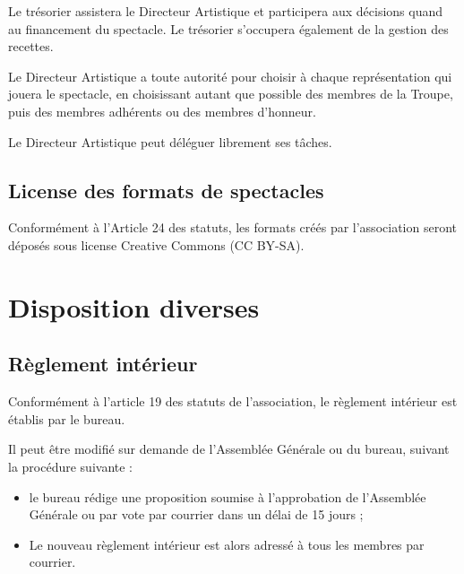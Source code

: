 \documentclass[a4paper,french,10pt]{article}
\begin{document}
Le trésorier assistera le Directeur Artistique et participera aux décisions quand au financement du spectacle. Le trésorier s'occupera également de la gestion des recettes.

Le Directeur Artistique a toute autorité pour choisir à chaque représentation qui jouera le spectacle, en choisissant autant que possible des membres de la Troupe, puis des membres adhérents ou des membres d'honneur.

Le Directeur Artistique peut déléguer librement ses tâches.

\subsection{License des formats de spectacles}
Conformément à l'Article 24 des statuts, les formats créés par l'association seront déposés sous license Creative Commons (CC BY-SA).


\section{Disposition diverses}
\subsection{Règlement intérieur}
Conformément à l'article 19 des statuts de l'association, le règlement intérieur est établis par le bureau.

Il peut être modifié sur demande de l'Assemblée Générale ou du bureau, suivant la procédure suivante :
\begin{itemize}
\item le bureau rédige une proposition soumise à l'approbation de l'Assemblée Générale ou par vote par courrier dans un délai de 15 jours ;
\item Le nouveau règlement intérieur est alors adressé à tous les membres par courrier.
\end{itemize}
\end{document}
